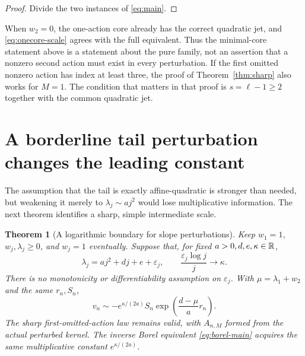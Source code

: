 \documentclass[11pt,a4paper]{article}
\numberwithin{equation}{section}
\newtheorem{theorem}{Theorem}[section]
\theoremstyle{definition}
\theoremstyle{remark}
\begin{document}
\begin{proof}
Divide the two instances of \eqref{eq:main}.
\end{proof}

When $w_2=0$, the one-action core already has the correct quadratic jet,
and \eqref{eq:onecore-scale} agrees with the full equivalent. Thus the
minimal-core statement above is a statement about the pure family, not an
assertion that a nonzero second action must exist in every perturbation.
If the first omitted nonzero action has index at least three, the proof of
Theorem~\ref{thm:sharp} also works for $M=1$. The condition that matters in
that proof is $s=\ell-1\ge2$ together with the common quadratic jet.

\section{A borderline tail perturbation changes the leading constant}
\label{sec:borderline}

The assumption that the tail is exactly affine-quadratic is stronger than
needed, but weakening it merely to $\lambda_j\sim a j^2$ would lose
multiplicative information. The next theorem identifies a sharp, simple
intermediate scale.

\begin{theorem}[A logarithmic boundary for slope perturbations]
\label{thm:borderline}
Keep $w_1=1$, $w_j,\lambda_j\ge0$, and $w_j=1$ eventually. Suppose that,
for fixed $a>0,d,e,\kappa\in\mathbb R$,
\begin{equation}
 \lambda_j=a j^2+d j+e+\varepsilon_j,
 \qquad \frac{\varepsilon_j\log j}{j}\longrightarrow\kappa.
 \label{eq:epsilon}
\end{equation}
There is no monotonicity or differentiability assumption on
$\varepsilon_j$. With $\mu=\lambda_1+w_2$ and the same $r_n,S_n$,
\begin{equation}
 v_n\sim-e^{\kappa/(2a)}S_n
                  \exp\!\left(\frac{d-\mu}{a}r_n\right).
 \label{eq:borderline-main}
\end{equation}
The sharp first-omitted-action law remains valid, with $A_{n,M}$ formed
from the actual perturbed kernel. The inverse Borel equivalent
\eqref{eq:borel-main} acquires the same multiplicative constant
$e^{\kappa/(2a)}$.
\end{theorem}
\end{document}
